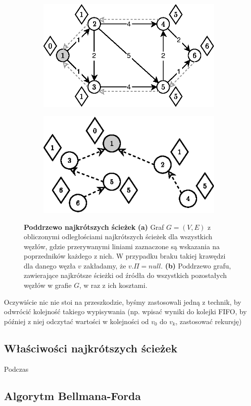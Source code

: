 \begin{figure}[!htbp]
	\centering
	\begin{subfigure}[b]{0.45\textwidth}
		\includegraphics[width=\textwidth]{Chapter_I/10/1_10a.eps}
		\caption{}
	\end{subfigure}%
	\qquad
	\begin{subfigure}[b]{0.45\textwidth}
		\includegraphics[width=\textwidth]{Chapter_I/10/1_10b.eps}
		\caption{}
	\end{subfigure}
	\caption{\textbf{Poddrzewo najkrótszych ścieżek} \textbf{(a)} Graf $G = \left( V, E \right)$ z obliczonymi odległościami najkrótszych ścieżek dla wszystkich węzłów, gdzie przerywanymi liniami zaznaczone są wskazania na poprzedników każdego z nich. W przypadku braku takiej krawędzi dla danego węzła $v$ zakładamy, że $v.\Pi = null$. \textbf{(b)} Poddrzewo grafu, zawierające najkrótsze ścieżki od źródła do wszystkich pozostałych węzłów w grafie $G$, w raz z ich kosztami.}\label{fig:shortestPathTree}
\end{figure}

Oczywiście nic nie stoi na przeszkodzie, byśmy zastosowali jedną z technik, by odwrócić kolejność takiego wypisywania (np. wpisać wyniki do kolejki FIFO, by później z niej odczytać wartości w kolejności od $v_{0}$ do $v_{k}$, zastosować rekursję)

\subsection{Właściwości najkrótszych ścieżek}

Podczas 

\subsection{Algorytm Bellmana-Forda}